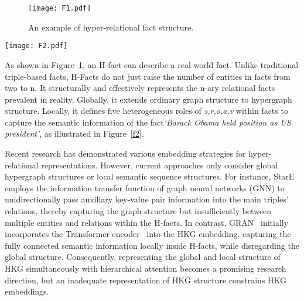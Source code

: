 \documentclass[11pt]{article}
\begin{document}
\begin{figure}[t]
\centering
\texttt{[image: F1.pdf]}
\caption{An example of hyper-relational fact structure.}
\label{f1}
\end{figure}

\begin{figure*}[h!t]
\centering
\texttt{[image: F2.pdf]}
\caption{The Global-level Hypergraph-based representation and Local-level Sequence-based representation based on three examples of H-Facts in HKGs. }
\label{f2}
\end{figure*}

As shown in Figure~\ref{f1}, an H-fact can describe a real-world fact. Unlike traditional triple-based facts, H-Facts do not just raise the number of entities in facts from two to n. It structurally and effectively represents the n-ary relational facts prevalent in reality. Globally, it extends ordinary graph structure to hypergraph~\citep{Hypergraph} structure. Locally, it defines five heterogeneous roles of \textit{s,r,o,a,v} within facts to capture the semantic information of the fact\textit{`Barack Obama held position as US president'}, as illustrated in Figure~\ref{f2}.

Recent research has demonstrated various embedding strategies for hyper-relational representations. However, current approaches only consider global hypergraph structures or local semantic sequence structures. For instance, StarE~\citep{StarE} employs the information transfer function of graph neural networks (GNN) to unidirectionally pass auxiliary key-value pair information into the main triples' relations, thereby capturing the graph structure but insufficiently between multiple entities and relations within the H-facts. In contrast, GRAN~\citep{GRAN} initially incorporates the Transformer encoder~\citep{Transformer} into the HKG embedding, capturing the fully connected semantic information locally inside H-facts, while disregarding the global structure. Consequently, representing the global and local structure of HKG simultaneously with hierarchical attention becomes a promising research direction, but an inadequate representation of HKG structure constrains HKG embeddings. 
\end{document}
